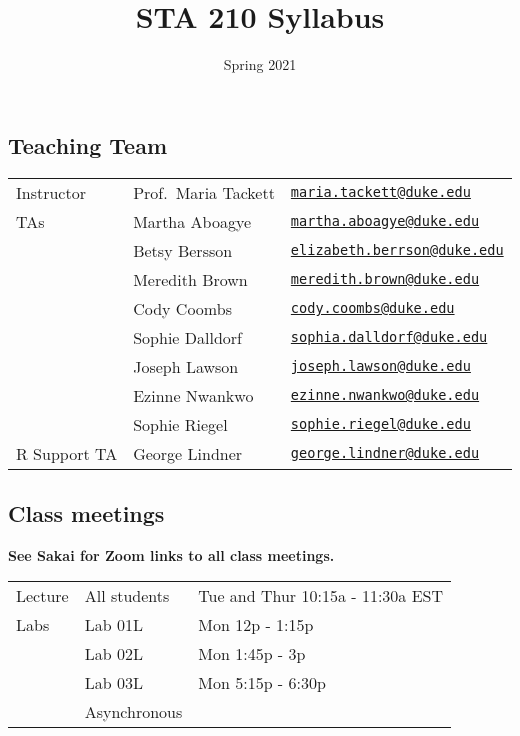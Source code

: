 \documentclass[
]{article}
\title{STA 210 Syllabus}
\subtitle{Spring 2021}
\author{}
\date{\vspace{-2.5em}}
\begin{document}
\maketitle

\hypertarget{teaching-team}{%
\subsection{Teaching Team}\label{teaching-team}}

\begin{longtable}[]{@{}lll@{}}
\toprule
\endhead
Instructor & Prof.~Maria Tackett &
\href{mailto:maria.tackett@duke.edu}{\nolinkurl{maria.tackett@duke.edu}}\tabularnewline
TAs & Martha Aboagye &
\href{mailto:martha.aboagye@duke.edu}{\nolinkurl{martha.aboagye@duke.edu}}\tabularnewline
& Betsy Bersson &
\href{mailto:elizabeth.berrson@duke.edu}{\nolinkurl{elizabeth.berrson@duke.edu}}\tabularnewline
& Meredith Brown &
\href{mailto:meredith.brown@duke.edu}{\nolinkurl{meredith.brown@duke.edu}}\tabularnewline
& Cody Coombs &
\href{mailto:cody.coombs@duke.edu}{\nolinkurl{cody.coombs@duke.edu}}\tabularnewline
& Sophie Dalldorf &
\href{mailto:sophia.dalldorf@duke.edu}{\nolinkurl{sophia.dalldorf@duke.edu}}\tabularnewline
& Joseph Lawson &
\href{mailto:joseph.lawson@duke.edu}{\nolinkurl{joseph.lawson@duke.edu}}\tabularnewline
& Ezinne Nwankwo &
\href{mailto:ezinne.nwankwo@duke.edu}{\nolinkurl{ezinne.nwankwo@duke.edu}}\tabularnewline
& Sophie Riegel &
\href{mailto:sophie.riegel@duke.edu}{\nolinkurl{sophie.riegel@duke.edu}}\tabularnewline
R Support TA & George Lindner &
\href{mailto:george.lindner@duke.edu}{\nolinkurl{george.lindner@duke.edu}}\tabularnewline
\bottomrule
\end{longtable}

\hypertarget{class-meetings}{%
\subsection{Class meetings}\label{class-meetings}}

\textbf{See Sakai for Zoom links to all class meetings.}

\begin{longtable}[]{@{}lll@{}}
\toprule
\endhead
Lecture & All students & Tue and Thur 10:15a - 11:30a EST\tabularnewline
Labs & Lab 01L & Mon 12p - 1:15p\tabularnewline
& Lab 02L & Mon 1:45p - 3p\tabularnewline
& Lab 03L & Mon 5:15p - 6:30p\tabularnewline
& Asynchronous &\tabularnewline
\bottomrule
\end{longtable}
\end{document}
